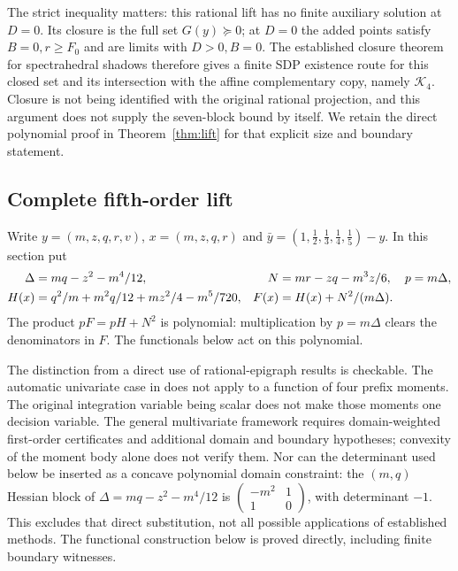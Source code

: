 \documentclass[pdflatex,sn-mathphys-num]{sn-jnl}
\theoremstyle{thmstyleone}
\theoremstyle{thmstyletwo}\newtheorem{remark}[theorem]{Remark}
\newcommand{\K}{\mathcal K}
\begin{document}
The strict inequality matters: this rational lift has no finite auxiliary
solution at $D=0$. Its closure is the full set $G(y)\succeq0$; at $D=0$
the added points satisfy $B=0,r\ge F_0$ and are limits with $D>0,B=0$.
The established closure theorem for spectrahedral shadows
\cite[Corollary 3.4, author version]{gn} therefore gives a finite SDP
existence route for this closed set and its intersection with the affine
complementary copy, namely $\K_4$. Closure is not being identified with
the original rational projection, and this argument does not supply the
seven-block bound by itself. We retain the direct polynomial proof in
Theorem~\ref{thm:lift} for that explicit size and boundary statement.

\subsection{Complete fifth-order lift}\label{sec:five}
Write $y=(m,z,q,r,v)$, $x=(m,z,q,r)$ and
$\bar y=(1,\tfrac12,\tfrac13,\tfrac14,\tfrac15)-y$. In this section put
\begin{align}
 \Delta&=mq-z^2-m^4/12,& N&=mr-zq-m^3z/6,& p&=m\Delta,\notag\\
 H(x)&=q^2/m+m^2q/12+mz^2/4-m^5/720,&
 F(x)&=H(x)+N^2/(m\Delta).\label{eq:five-boundary}
\end{align}
The product $pF=pH+N^2$ is polynomial: multiplication by $p=m\Delta$
clears the denominators in $F$. The functionals below act on this polynomial.

The distinction from a direct use of rational-epigraph results is
checkable. The automatic univariate case in \cite[Theorem 3.6, 2009 author
revision]{nierational} does not apply to a function of four prefix moments.
The original integration variable being scalar does not make those moments
one decision variable. The general multivariate framework requires
domain-weighted first-order certificates and additional domain and boundary
hypotheses; convexity of the moment body alone does not verify them.
Nor can the determinant used below be inserted as
a concave polynomial domain constraint: the $(m,q)$ Hessian block of
$\Delta=mq-z^2-m^4/12$ is
$\left(\begin{smallmatrix}-m^2&1\\1&0\end{smallmatrix}\right)$, with determinant
$-1$. This excludes that direct substitution, not all possible applications
of established methods. The functional construction below is proved
directly, including finite boundary witnesses.
\end{document}
